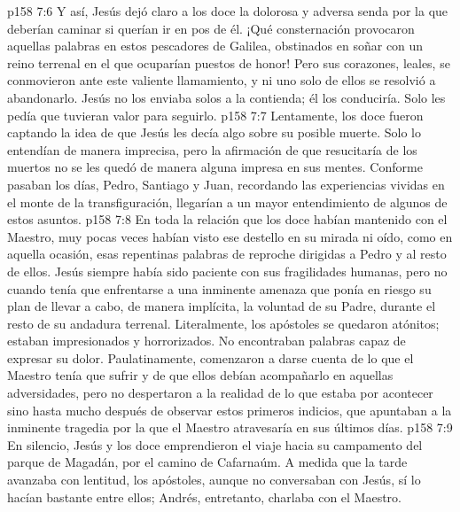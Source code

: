 \vs p158 7:6 Y así, Jesús dejó claro a los doce la dolorosa y adversa senda por la que deberían caminar si querían ir en pos de él. ¡Qué consternación provocaron aquellas palabras en estos pescadores de Galilea, obstinados en soñar con un reino terrenal en el que ocuparían puestos de honor! Pero sus corazones, leales, se conmovieron ante este valiente llamamiento, y ni uno solo de ellos se resolvió a abandonarlo. Jesús no los enviaba solos a la contienda; él los conduciría. Solo les pedía que tuvieran valor para seguirlo.
\vs p158 7:7 Lentamente, los doce fueron captando la idea de que Jesús les decía algo sobre su posible muerte. Solo lo entendían de manera imprecisa, pero la afirmación de que resucitaría de los muertos no se les quedó de manera alguna impresa en sus mentes. Conforme pasaban los días, Pedro, Santiago y Juan, recordando las experiencias vividas en el monte de la transfiguración, llegarían a un mayor entendimiento de algunos de estos asuntos.
\vs p158 7:8 En toda la relación que los doce habían mantenido con el Maestro, muy pocas veces habían visto ese destello en su mirada ni oído, como en aquella ocasión, esas repentinas palabras de reproche dirigidas a Pedro y al resto de ellos. Jesús siempre había sido paciente con sus fragilidades humanas, pero no cuando tenía que enfrentarse a una inminente amenaza que ponía en riesgo su plan de llevar a cabo, de manera implícita, la voluntad de su Padre, durante el resto de su andadura terrenal. Literalmente, los apóstoles se quedaron atónitos; estaban impresionados y horrorizados. No encontraban palabras capaz de expresar su dolor. Paulatinamente, comenzaron a darse cuenta de lo que el Maestro tenía que sufrir y de que ellos debían acompañarlo en aquellas adversidades, pero no despertaron a la realidad de lo que estaba por acontecer sino hasta mucho después de observar estos primeros indicios, que apuntaban a la inminente tragedia por la que el Maestro atravesaría en sus últimos días.
\vs p158 7:9 En silencio, Jesús y los doce emprendieron el viaje hacia su campamento del parque de Magadán, por el camino de Cafarnaúm. A medida que la tarde avanzaba con lentitud, los apóstoles, aunque no conversaban con Jesús, sí lo hacían bastante entre ellos; Andrés, entretanto, charlaba con el Maestro.

